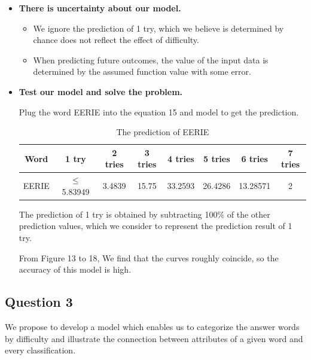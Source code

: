 \documentclass{mcmthesis}
\begin{document}
\begin{itemize}
We use R to calculate the estimated regression equation:

\begin{equation} \label{eq5}
    \varGamma_s^{'} =9.9978 + 0.0497\times \varGamma_w + \varepsilon , \varepsilon \sim N(0,\sigma^{2} )   
\end{equation}


\item {\bf There is uncertainty about our model.}

\begin{itemize}
    \item[1)] We ignore the prediction of 1 try, which we believe is determined by chance does not reflect the effect of difficulty.
    \item[2)] When predicting future outcomes, the value of the input data is determined by the assumed function value with some error.
\end{itemize}

\item {\bf Test our model and solve the problem.}

Plug the word EERIE into the equation 15 and model to get the prediction.

\begin{table}[H]  %
    \centering        %
    \caption{The prediction of EERIE}  %
    \vspace{0.1cm}
    \label{tab8}                       %
    \renewcommand\arraystretch{1.2}
    \begin{tabular}{|c|c|c|c|c|c|c|c|}  %
    \hline                    %
    Word & 1 try & 2 tries & 3 tries & 4 tries & 5 tries & 6 tries & 7 tries \\ \hline
    EERIE & $\boldsymbol\leqslant $ 5.83949 & 3.4839 &	15.75 &	33.2593 & 26.4286 & 13.28571 & 2    \\ \hline
    \end{tabular}
\end{table}

The prediction of 1 try is obtained by subtracting 100\% of the other prediction values, which we consider to represent the prediction result of 1 try.

From Figure 13 to 18, We find that the curves roughly coincide, so the accuracy of this model is high.

\end{itemize}

\subsection{Question 3}
We propose to develop a model which enables us to categorize the answer words by difficulty and illustrate the connection between attributes of a given word and every classification.
\end{document}
